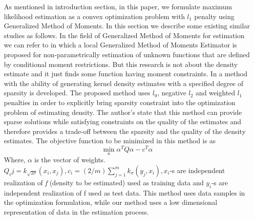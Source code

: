 As mentioned in introduction section, in this paper, we formulate maximum likelihood estimation as a convex optimization problem with $l_1$ penalty using Generalized Method of Moments. In this section we describe some existing similar studies as follows. 
In the field of Generalized Method of Moments for estimation we can refer to \cite{lewbel2007local} in which a local Generalized Method of Moments Estimator is proposed for non-parametrically estimation of unknown functions that are defined by conditional moment restrictions. But this research is not about the density estimate and it just finds some function having moment constraints. In \cite{gopalakrishnaneecs} a method with the ability of generating kernel density estimates with a specified degree of sparsity is developed. The proposed method uses $l_0$, negative $l_2$ and weighted $l_1$ penalties in order to explicitly bring sparsity constraint into the optimization problem of estimating density. The author's state that this method can provide sparse solutions while satisfying constraints on the quality of the estimates and therefore provides a trade-off between the sparsity and the quality of the density estimates. The objective function to be minimized in this method is as
\begin{equation}
\label{e1}
\min_a{\alpha^TQ\alpha-c^T\alpha}
\end{equation}
Where,  $\alpha$ is the vector of weights. $Q_ij=k_{\sqrt{2\sigma}}(x_i,x_j), c_i=(2/m)\sum_{j=1}^mk_{\sigma}(y_j,x_i), x_i$-s are independent realization of \emph{f} (density to be estimated) used as training data and $y_i$-s are independent realization of f used as test data. This method uses data samples in the optimization formulation, while our method uses a low dimensional representation of data in the estimation process.
